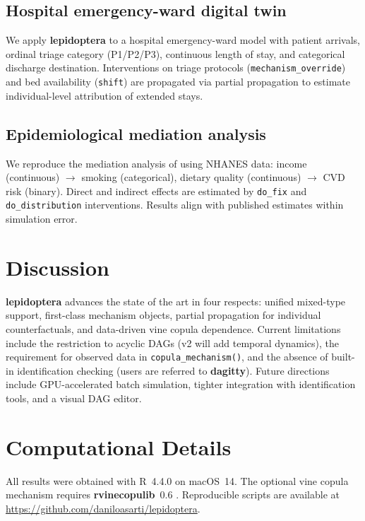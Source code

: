 \documentclass[12pt,a4paper]{article}
\newcommand{\pkg}[1]{\textbf{#1}}
\newcommand{\code}[1]{\texttt{#1}}
\begin{document}
\subsection{Hospital emergency-ward digital twin}
We apply \pkg{lepidoptera} to a hospital emergency-ward model \citep{sargent2010verification} with patient arrivals, ordinal triage category (P1/P2/P3), continuous length of stay, and categorical discharge destination. Interventions on triage protocols (\code{mechanism\_override}) and bed availability (\code{shift}) are propagated via partial propagation to estimate individual-level attribution of extended stays.

\subsection{Epidemiological mediation analysis}
We reproduce the mediation analysis of \citet{vanderweele2015explanation} using NHANES data: income (continuous) $\to$ smoking (categorical), dietary quality (continuous) $\to$ CVD risk (binary). Direct and indirect effects are estimated by \code{do\_fix} and \code{do\_distribution} interventions. Results align with published estimates within simulation error.

\section{Discussion}
\label{sec:discussion}

\pkg{lepidoptera} advances the state of the art in four respects: unified mixed-type support, first-class mechanism objects, partial propagation for individual counterfactuals, and data-driven vine copula dependence. Current limitations include the restriction to acyclic DAGs (v2 will add temporal dynamics), the requirement for observed data in \code{copula\_mechanism()}, and the absence of built-in identification checking (users are referred to \pkg{dagitty}). Future directions include GPU-accelerated batch simulation, tighter integration with identification tools, and a visual DAG editor.

\section*{Computational Details}
All results were obtained with R~4.4.0 \citep{rcore2024} on macOS~14. The optional vine copula mechanism requires \pkg{rvinecopulib}~0.6 \citep{nagler2021rvinecopulib}. Reproducible scripts are available at \url{https://github.com/daniloasarti/lepidoptera}.
\end{document}
